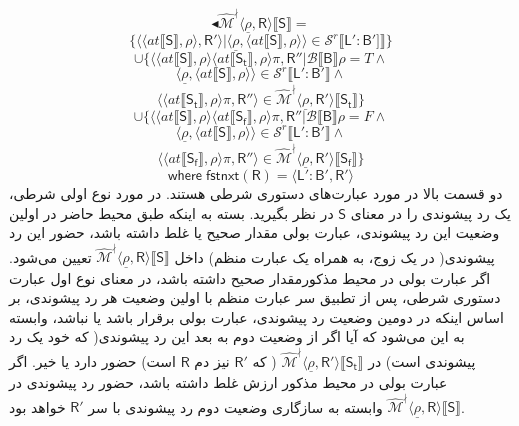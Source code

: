 $$\blacktriangleleft\mathcal{\hat{M}^\nmid} \langle \underline{\rho},\mathsf{R} \rangle \llbracket \mathsf{S} \rrbracket=$$
$$\{\langle \langle at \llbracket \mathsf{S} \rrbracket , \rho \rangle , \mathsf{R'} \rangle | \langle \underline{\rho} , \langle at \llbracket \mathsf{S} \rrbracket , \rho \rangle \rangle \in \mathcal{S}^r \llbracket \mathsf{L':B'} ]\rrbracket \}$$
$$\cup \{\langle \langle at \llbracket \mathsf{S} \rrbracket , \rho \rangle \langle at \llbracket \mathsf{S_t} \rrbracket, \rho \rangle \pi, \mathsf{R''} | \mathcal{B}\llbracket\mathsf{B} \rrbracket \rho = \mathit{T} \land$$
$$\langle \underline{\rho},\langle at \llbracket \mathsf{S} \rrbracket , \rho \rangle \rangle \in \mathcal{S}^r \llbracket \mathsf{L':B'} \rrbracket \land$$
$$\langle \langle at \llbracket \mathsf{S_t} \rrbracket , \rho \rangle \pi,\mathsf{R''} \rangle \in \mathcal{\hat{M}^\nmid} \langle \underline{\rho}, \mathsf{R'} \rangle  \llbracket \mathsf{S_t} \rrbracket \}$$
$$\cup \{\langle \langle at \llbracket \mathsf{S} \rrbracket , \rho \rangle \langle at \llbracket \mathsf{S_f} \rrbracket, \rho \rangle \pi, \mathsf{R''} | \mathcal{B}\llbracket\mathsf{B} \rrbracket \rho = \mathit{F} \land$$
$$\langle \underline{\rho},\langle at \llbracket \mathsf{S} \rrbracket , \rho \rangle \rangle \in \mathcal{S}^r \llbracket \mathsf{L':B'} \rrbracket \land$$
$$\langle \langle at \llbracket \mathsf{S_f} \rrbracket , \rho \rangle \pi,\mathsf{R''} \rangle \in \mathcal{\hat{M}^\nmid}  \langle \underline{\rho}, \mathsf{R'} \rangle \llbracket \mathsf{S_f} \rrbracket \}$$
$$\mathsf{where\; fstnxt(R)=\langle L':B', R' \rangle}$$
دو قسمت بالا در مورد عبارت‌های دستوری شرطی هستند. در مورد نوع اولی شرطی، یک رد پیشوندی را در معنای $\mathsf{S}$ در نظر بگیرید. بسته به اینکه طبق محیط حاضر در اولین وضعیت این رد پیشوندی، عبارت بولی مقدار صحیح یا غلط داشته باشد، حضور این رد پیشوندی( در یک زوج، به همراه یک عبارت منظم) داخل 
$\mathcal{\hat{M}^\nmid} \langle \underline{\rho},\mathsf{R} \rangle \llbracket \mathsf{S} \rrbracket$
تعیین می‌شود. اگر عبارت بولی در محیط مذکورمقدار صحیح داشته باشد، 
در معنای نوع اول عبارت‌ دستوری شرطی، پس از تطبیق سر عبارت منظم با اولین وضعیت هر رد پیشوندی، بر اساس اینکه در دومین وضعیت رد پیشوندی، عبارت بولی برقرار باشد یا نباشد، وابسته به این می‌شود که آیا اگر از وضعیت دوم به بعد این رد پیشوندی( که خود یک رد پیشوندی است) در 
$\mathcal{\hat{M}^\nmid} \langle \underline{\rho},\mathsf{R'} \rangle \llbracket \mathsf{S_t} \rrbracket$
( که $\mathsf{R'}$ نیز دم $\mathsf{R}$ است) حضور دارد یا خیر. اگر عبارت بولی در محیط مذکور ارزش غلط داشته باشد، حضور رد پیشوندی در
$\mathcal{\hat{M}^\nmid} \langle \underline{\rho},\mathsf{R} \rangle \llbracket \mathsf{S} \rrbracket$
وابسته به سازگاری وضعیت دوم رد پیشوندی با سر $\mathsf{R'}$ خواهد بود.

